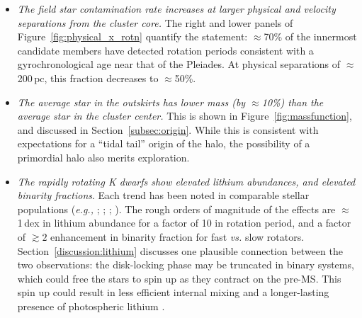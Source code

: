 \documentclass[12pt,twocolumn,tighten]{aastex63}
\newcommand{\kms}{\,km\,s$^{-1}$}
\begin{document}
\begin{itemize}
{   	tangential velocity separations of $\approx$2\kms.}
  \item {\it The field star contamination rate increases at larger
    physical and velocity separations from the cluster core.} The
    right and lower panels of Figure~\ref{fig:physical_x_rotn}
    quantify the statement: $\approx$70\% of the innermost
    candidate members have detected rotation periods consistent with a
    gyrochronological age near that of the Pleiades. At physical
    separations of $\approx$200\,pc, this fraction decreases to
    $\approx$50\%.  
   \item {\it The average star in the outskirts has lower mass (by $\approx$10\%)
   than the average star in the cluster center.}
   This is shown in Figure~\ref{fig:massfunction}, and discussed in
   Section~\ref{subsec:origin}.
   While this is consistent with expectations for a
   ``tidal tail'' origin of the halo, the possibility of a primordial halo
   also merits exploration.
   \item {\it The rapidly rotating K dwarfs show elevated lithium abundances, and
     elevated binarity fractions}.  Each trend has been noted in
     comparable stellar populations ({\it e.g.,}
     \citealt{soderblom_evolution_1993};
     \citealt{meibom_effect_2007};
     \citealt{jeffries_m35_li_2020}; \citealt{gillen_ngts_2020}).  The
     rough orders of magnitude of the effects are $\approx$1\,dex in
     lithium abundance for a factor of 10 in rotation period, and a
     factor of $\gtrsim2$ enhancement in binarity fraction for fast
     {\it vs{.}} slow rotators.  
     Section~\ref{discussion:lithium} discusses one plausible
     connection between the two observations: the disk-locking
     phase may be truncated in binary systems, which could free the
     stars to spin up as they contract on the pre-MS.  This spin up
     could result in less efficient internal mixing and a
     longer-lasting presence of photospheric lithium
     \citep{eggenberger_impact_2012}.
\end{itemize}
\end{document}
